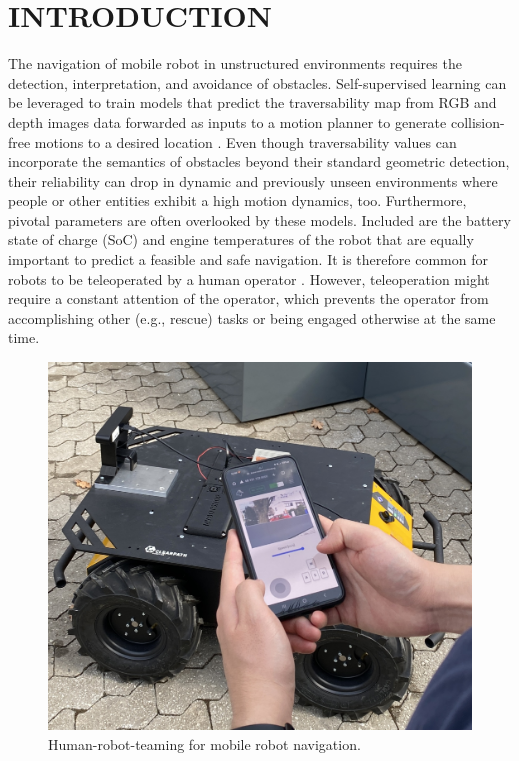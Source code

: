 \documentclass[letterpaper, 10 pt, conference]{ieeeconf}  %
\begin{document}
\section{INTRODUCTION}
The navigation of mobile robot in unstructured environments requires the detection, interpretation, and avoidance of obstacles.  
Self-supervised learning can be leveraged to train  models that predict the traversability map from RGB and depth images data forwarded as inputs to a motion planner to generate collision-free motions to a desired location \cite{wayfaster,wayfast,leung2022hybrid,endo2024benchnav}. 
Even though traversability values can incorporate the semantics of obstacles beyond their standard geometric detection, their reliability can drop in dynamic and previously unseen environments \cite{frey2024roadrunner,muhamad2024robust} where people or other entities exhibit a high motion dynamics, too. Furthermore, pivotal parameters are often overlooked by these models. Included are the battery state of charge (SoC) and engine temperatures of the robot that are equally important to predict a feasible and safe navigation. It is therefore common for robots to be  teleoperated by a human operator \cite{huang2024evaluation,husky}. However, teleoperation might require a constant attention of the operator, which prevents the operator from accomplishing other (e.g., rescue) tasks or being engaged otherwise at the same time.


\begin{figure}[t]
	\centerline{\includegraphics[width=0.9\columnwidth]{images/galaxycontrol.jpg}}
	\caption{Human-robot-teaming for mobile robot navigation.}
	\label{fig:galaxycontrol}
\end{figure}
\end{document}
